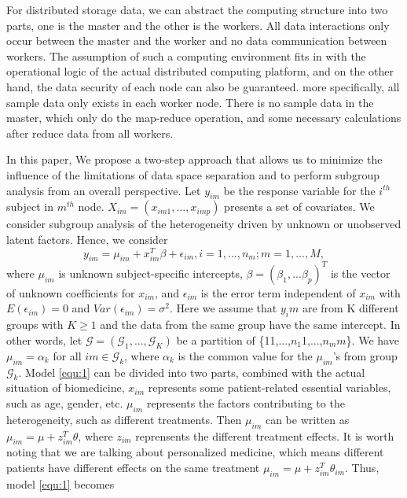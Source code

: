 \documentclass[review]{elsarticle}
\begin{document}
For distributed storage data, we can abstract the computing structure into two parts, one is the master and the other is the workers. All data interactions only occur between the master and the worker and no data communication between workers. The assumption of such a computing environment fits in with the operational logic of the actual distributed computing platform, and on the other hand, the data security of each node can also be guaranteed. more specifically, all sample data only exists in each worker node. There is no sample data in the master, which only do the map-reduce operation, and some necessary calculations after reduce data from all workers.

In this paper, We propose a two-step approach that allows us to minimize the influence of the limitations of data space separation and to perform subgroup analysis from an overall perspective. Let $y_{im}$ be the response variable for the $i^{th}$ subject in $m^{th}$ node. $X_{im}=(x_{im1},...,x_{imp})$ presents a set of covariates. We consider subgroup analysis of the heterogeneity driven by unknown or unobserved latent factors. Hence, we consider
\begin{equation}
y_{im} = \mu_{im} + x_{im}^T\beta + \epsilon_{im}, i=1,...,n_m; m=1,...,M,
\label{equ:1}
\end{equation}
where $\mu_{im}$ is unknown subject-specific intercepts, $\beta = (\beta_1,...\beta_p)^T$ is the vector of unknown coefficients for $x_{im}$, and $\epsilon_{im}$ is the error term independent of $x_{im}$ with $E(\epsilon_{im})=0$ and $Var(\epsilon_{im})=\sigma^2$. Here we assume that $y_im$ are from K different groups with $K\geq 1$ and the data from the same group have the same intercept. In other words, let $\mathcal{G}=(\mathcal{G}_1,...,\mathcal{G}_K)$ be a partition of \{11,...,$n_1$1,...,$n_mm$\}. We have $\mu_{im}=\alpha_k$ for all $im\in \mathcal{G}_k$, where $\alpha_k$ is the common value for the $\mu_{im}$'s from group $\mathcal{G}_k$. Model \ref{equ:1} can be divided into two parts, combined with the actual situation of biomedicine, $x_{im}$ represents some patient-related essential variables, such as age, gender, etc. $\mu_{im}$ represents the factors contributing to the heterogeneity, such as different treatments. Then $\mu_{im}$ can be written as $\mu_{im}=\mu+z_{im}^T\theta$, where $z_{im}$ reprensents the different treatment effects. It is worth noting that we are talking about personalized medicine, which means different patients have different effects on the same treatment $\mu_{im}=\mu+z_{im}^T\theta_{im}$. Thus, model \ref{equ:1} becomes
\end{document}
